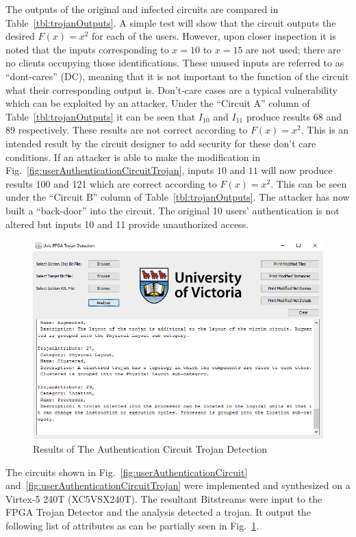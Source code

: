 \documentclass[journal, hidelinks]{IEEEtran}
\begin{document}
The outputs of the original and infected circuits are compared in Table~\ref{tbl:trojanOutputs}.
A simple test will show that the circuit outputs the desired $F(x) = x^2$ for each of the users.
However, upon closer inspection it is noted that the inputs corresponding to $x = 10$ to $x = 15$ are not used; there are no clients occupying those identifications.
These unused inputs are referred to as ``dont-cares'' (DC), meaning that it is not important to the function of the circuit what their corresponding output is.
Don't-care cases are a typical vulnerability which can be exploited by an attacker.
Under the ``Circuit A'' column of Table~\ref{tbl:trojanOutputs} it can be seen that $I_{10}$ and $I_{11}$ produce results 68 and 89 respectively.
These results are not correct according to $F(x) = x^2$.
This is an intended result by the circuit designer to add security for these don't care conditions.
If an attacker is able to make the modification in Fig.~\ref{fig:userAuthenticationCircuitTrojan}, inputs $10$ and $11$ will now produce results 100 and 121 which are correct according to $F(x) = x^2$.
This can be seen under the ``Circuit B'' column of Table~\ref{tbl:trojanOutputs}.
The attacker has now built a ``back-door'' into the circuit.
The original 10 users' authentication is not altered but inputs 10 and 11 provide unauthorized access.
\begin{figure}[b]
	\centering
	\includegraphics[width=0.7\linewidth]{Figures/backDoorResult}
	\caption[Results of The Authentication Circuit Trojan Detection]{Results of The Authentication Circuit Trojan Detection}
	\label{fig:backDoorResult}
\end{figure}

The circuits shown in Fig.~\ref{fig:userAuthenticationCircuit} and~\ref{fig:userAuthenticationCircuitTrojan} were implemented and synthesized on a Virtex-5 240T  (XC5VSX240T).
The resultant Bitstreams were input to the FPGA Trojan Detector and the analysis detected a trojan.
It output the following list of attributes as can be partially seen in Fig.~\ref{fig:backDoorResult}.
\end{document}
